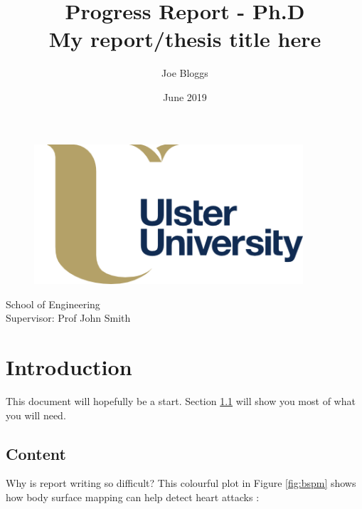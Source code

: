 \documentclass{article}
\title{\huge{\textbf{Progress Report - Ph.D}} \\
\LARGE{My report/thesis title here}}
\author{Joe Bloggs}
\date{June 2019}
\begin{document}
\clearpage\maketitle
\thispagestyle{empty}
\begin{center}
    \begin{figure}[h]
        \centering
        \includegraphics[width=10cm]{pics/uu_logo.png}
        \label{fig:logo}
    \end{figure}
    \large{School of Engineering \\
    Supervisor: Prof John Smith}
\end{center}
\newpage
\setcounter{page}{1}
\tableofcontents
\listoffigures
\listoftables

\newpage
{} %


\section{Introduction}
This document will hopefully be a start. Section \ref{Content} will show you most of what you will need.
\subsection{Content}\label{Content}
Why is report writing so difficult? This colourful plot in Figure \ref{fig:bspm} shows how body surface mapping can help detect heart attacks \cite{jennings2019}:
\end{document}
